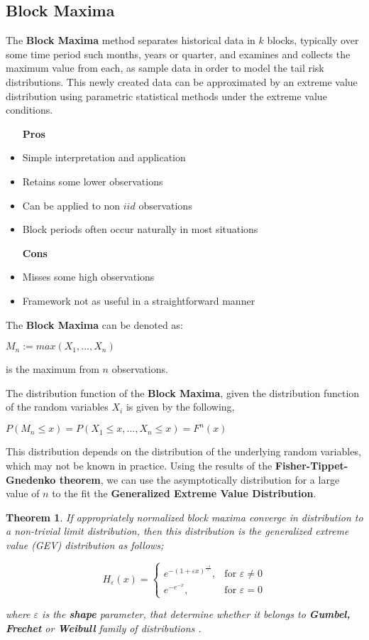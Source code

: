 \documentclass[11pt,a4paper]{article}
\theoremstyle{plain}
\newtheorem{thm}[fact]{Theorem}
\begin{document}
\subsection{Block Maxima}
The \textbf{Block Maxima} method separates historical data in $k$ blocks, typically over some time period such months, years or quarter, and examines and collects the maximum  value from each, as sample data in order to model the tail risk distributions. This newly created data can be approximated by an extreme value distribution using parametric statistical methods under the extreme value conditions.  

\begin{itemize}
\item [\textbf{Pros}]
\item Simple interpretation and application  
\item Retains some lower observations
\item Can be applied to non $iid$ observations
\item Block periods often occur naturally in most situations
\item [\textbf{Cons}]
\item Misses some high observations 
\item Framework not as useful in a straightforward manner
\end{itemize}

The \textbf{Block Maxima} can be denoted as:
\begin{center}
$M_n := max(X_1,...,X_n)$
\end{center}
is the maximum from $n$ observations. 

The distribution function of the \textbf{Block Maxima}, given the distribution function of the random variables $X_i$ is given by the following,
\begin{center}
$P(M_n\leq x)=P(X_1 \leq x,...,X_n \leq x)=F^n(x)$
\end{center}

This distribution depends on the distribution of the underlying random variables, which may not be known in practice. Using the results of the \textbf{Fisher-Tippet-Gnedenko theorem}, we can use the asymptotically distribution for a large value of $n$ to the  fit  the \textbf{Generalized Extreme Value Distribution}. 
\begin{thm}
If appropriately normalized block maxima converge in distribution to a non-trivial limit distribution, then this distribution is the generalized extreme value (GEV) distribution as follows;
\begin{center}
 \[
     H_{\varepsilon}(x)=\left\{
                \begin{array}{ll}
                  e^{-(1+\varepsilon x)^{\frac{-1}{\varepsilon}}},&\text{for  $\varepsilon \neq 0$}\\
                  e^{-e^{-x}},&\text {for $\varepsilon =0$}
                \end{array}
              \right.
 \]
\end{center}
where $\varepsilon$ is the \textbf{shape} parameter, that determine whether it belongs to \textbf{Gumbel, Frechet} or \textbf{Weibull} family of distributions .
\end{thm}
\end{document}
